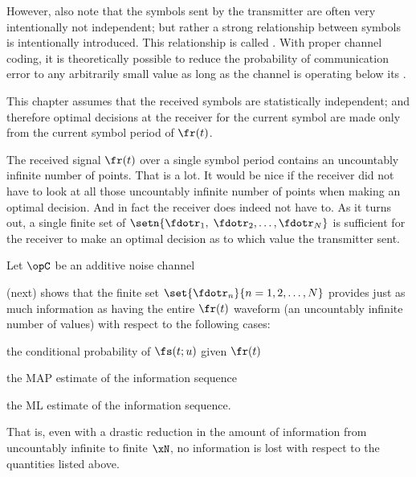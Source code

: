 However, also note that the symbols sent by the transmitter
are often very intentionally not independent;
but rather a strong relationship between symbols is intentionally
introduced. This relationship is called .
With proper channel coding, it is theoretically possible
to reduce the probability of communication error to any
arbitrarily small value as long as the channel is operating below its
.

This chapter assumes that the received symbols are
statistically independent;
and therefore optimal decisions at the receiver
for the current symbol are made
only from the current symbol period of $\fr(t)$.

The received signal $\fr(t)$ over a single symbol period
contains an uncountably infinite number of points.
That is a lot.
It would be nice if the receiver did not have to look
at all those uncountably infinite number of points
when making an optimal decision.
And in fact the receiver does indeed not have to.
As it turns out, a single finite set of 
$\setn{\fdotr_1,\;\fdotr_2,\ldots,\fdotr_N}$
is sufficient for the receiver to make an optimal decision as to
which value the transmitter sent.

\begin{definition}
\label{def:chan_stats}
Let $\opC$ be an additive noise channel
\end{definition}



 (next) shows that the finite set
$\set{\fdotr_n}{n=1,2,\ldots,N}$ provides just as
much information as having the entire $\fr(t)$ waveform
(an uncountably infinite number of values)
with respect to the following cases:
\begin{enume}
   \item the conditional probability of $\fs(t;u)$ given $\fr(t)$
   \item the MAP estimate of the information sequence
   \item the ML estimate of the information sequence.
\end{enume}
That is, even with a drastic reduction in the amount of information
from uncountably infinite to finite $\xN$,
no information is lost with respect to the quantities listed above.

